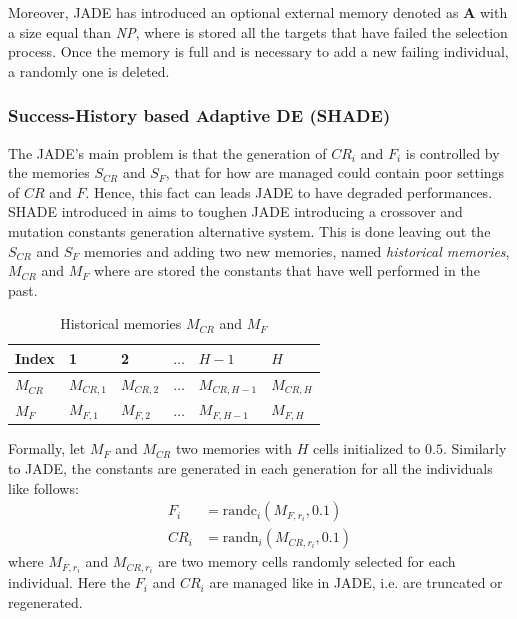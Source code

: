Moreover, JADE has introduced an optional external memory denoted as \textbf{A} with a size equal than \textit{NP}, where is stored all the targets that have failed the selection process. Once the memory is full and is necessary to add a new failing individual, a randomly one is deleted.

\subsubsection{Success-History based Adaptive DE (SHADE)}
The JADE's main problem is that the generation of $\textit{CR}_{i}$ and $F_{i}$ is controlled by the memories $S_{\textit{CR}}$ and $S_{F}$, that for how are managed could contain poor settings of $\textit{CR}$ and $F$. Hence, this fact can leads JADE to have degraded performances.\newline\newline
SHADE introduced in \cite{SHADE:2013} aims to toughen JADE introducing a crossover and mutation constants generation alternative system. This is done leaving out the $S_{\textit{CR}}$ and $S_{F}$ memories and adding two new memories, named \textit{historical memories}, $M_{\textit{CR}}$ and $M_{F}$ where are stored the constants that have well performed in the past.\\

\begin{table}[h]
	\centering
	\begin{tabular}{|l|l|l|l|l|l|}
		\hline
		Index             & 1                   & 2                   & $\dots$ & $H -1$                & $H$                 \\ 
		\hline
		$M_{\textit{CR}}$ & $M_{\textit{CR},1}$ & $M_{\textit{CR},2}$ & $\dots$ & $M_{\textit{CR},H-1}$ & $M_{\textit{CR},H}$ \\ 
		\hline
		$M_{F}$           & $M_{F, 1}$          & $M_{F, 2}$          & $\dots$ & $M_{F, H-1}$          & $M_{F, H}$          \\ 
		\hline
	\end{tabular}
	\caption{Historical memories $M_{\textit{CR}}$ and $M_{F}$}
\end{table}

Formally, let $M_{F}$ and $M_{\textit{CR}}$ two memories with $H$ cells initialized to $0.5$. Similarly to JADE, the constants are generated in each generation for all the individuals like follows:
\begin{align}
	F_i &= \textrm{randc}_{i}(M_{F, r_{i}}, 0.1) \\
	\textit{CR}_i &= \textrm{randn}_{i}(M_{\textit{CR},r_{i}}, 0.1)
\end{align}
where $M_{F, r_{i}}$ and $M_{\textit{CR}, r_{i}}$ are two memory cells randomly selected for each individual. Here the $F_{i}$ and $\textit{CR}_{i}$ are managed like in JADE, i.e. are truncated or regenerated.

